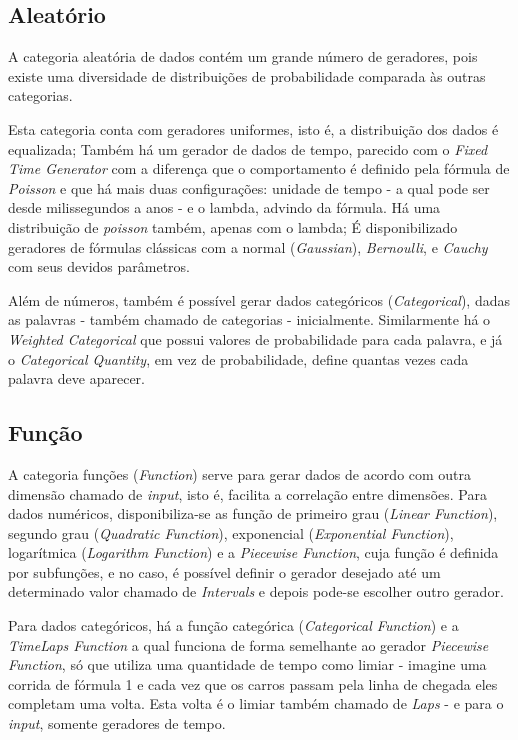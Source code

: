\documentclass[
	12pt,				%
	openright,			%
	oneside,			%
	a4paper,			%
	english,			%
	brazil				%
	]{abntex2}
\begin{document}
		\subsection{Aleatório}
			A categoria aleatória de dados contém um grande número de geradores, pois existe uma diversidade de distribuições de probabilidade comparada às outras categorias.
			\par
			Esta categoria conta com geradores uniformes, isto é, a distribuição dos dados é equalizada;
				Também há um gerador de dados de tempo, parecido com o \emph{Fixed Time Generator} com a diferença que o comportamento é definido pela fórmula de \emph{Poisson} e que há mais duas configurações: unidade de tempo - a qual pode ser desde milissegundos a anos - e o lambda, advindo da fórmula.
				Há uma distribuição de \emph{poisson} também, apenas com o lambda;
				É disponibilizado geradores de fórmulas clássicas com a normal (\emph{Gaussian}), \emph{Bernoulli}, e \emph{Cauchy} com seus devidos parâmetros.
			\par
			Além de números, também é possível gerar dados categóricos (\emph{Categorical}), dadas as palavras - também chamado de categorias - inicialmente.
				Similarmente há o \emph{Weighted Categorical} que possui valores de probabilidade para cada palavra, e 
				já o \emph{Categorical Quantity}, em vez de probabilidade, define quantas vezes cada palavra deve aparecer.
		\subsection{Função}
			A categoria funções (\emph{Function}) serve para gerar dados de acordo com outra dimensão chamado de \emph{input}, isto é, facilita a correlação entre dimensões.
			Para dados numéricos, disponibiliza-se as 
				função de primeiro grau (\emph{Linear Function}), 
				segundo grau (\emph{Quadratic Function}), 
				exponencial (\emph{Exponential Function}), 
				logarítmica (\emph{Logarithm Function}) e
				a \emph{Piecewise Function}, cuja função é definida por subfunções, e no caso, é possível definir o gerador desejado até um determinado valor chamado de \emph{Intervals} e depois pode-se escolher outro gerador.
			\par
			Para dados categóricos, há a função categórica (\emph{Categorical Function}) e 
			a \emph{TimeLaps Function} a qual funciona de forma semelhante ao gerador \emph{Piecewise Function}, só que utiliza uma quantidade de tempo como limiar - imagine uma corrida de fórmula 1 e cada vez que os carros passam pela linha de chegada eles completam uma volta. 
			Esta volta é o limiar também chamado de \emph{Laps} - e para o \emph{input}, somente geradores de tempo.
\end{document}
